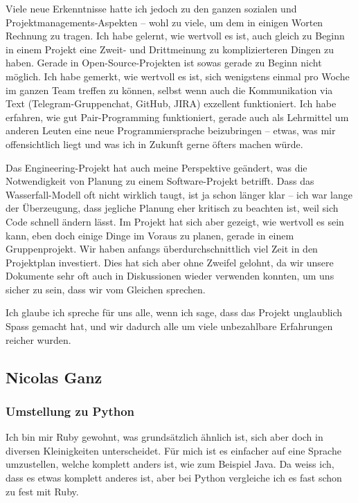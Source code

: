 \documentclass[a4paper]{article}
\begin{document}
Viele neue Erkenntnisse hatte ich jedoch zu den ganzen sozialen und
Projektmanagements-Aspekten -- wohl zu viele, um dem
in einigen Worten Rechnung zu tragen. Ich habe gelernt, wie wertvoll es ist,
auch gleich zu Beginn in einem Projekt eine Zweit- und Drittmeinung zu
komplizierteren Dingen zu haben. Gerade in Open-Source-Projekten ist sowas gerade zu
Beginn nicht möglich. Ich habe gemerkt, wie wertvoll es ist, sich
wenigstens einmal pro Woche im ganzen Team treffen zu können, selbst wenn auch
die Kommunikation via Text (Telegram-Gruppenchat, GitHub, JIRA) exzellent
funktioniert. Ich habe erfahren, wie gut Pair-Programming funktioniert,
gerade auch als Lehrmittel um anderen Leuten eine neue Programmiersprache
beizubringen -- etwas, was mir offensichtlich liegt und was ich in Zukunft gerne
öfters machen würde.

Das Engineering-Projekt hat auch meine Perspektive geändert, was die
Notwendigkeit von Planung zu einem Software-Projekt betrifft. Dass das
Wasserfall-Modell oft nicht wirklich taugt, ist ja schon länger klar -- ich war
lange der Überzeugung, dass jegliche Planung eher kritisch zu beachten ist, weil
sich Code schnell ändern lässt. Im Projekt hat sich aber gezeigt, wie wertvoll
es sein kann, eben doch einige Dinge im Voraus zu planen, gerade in einem
Gruppenprojekt. Wir haben anfangs überdurchschnittlich viel Zeit in den
Projektplan investiert. Dies hat sich aber ohne Zweifel gelohnt, da wir unsere
Dokumente sehr oft auch in Diskussionen wieder verwenden konnten, um uns sicher
zu sein, dass wir vom Gleichen sprechen.

Ich glaube ich spreche für uns alle, wenn ich sage, dass das Projekt
unglaublich Spass gemacht hat, und wir dadurch alle um viele unbezahlbare
Erfahrungen reicher wurden.

\pagebreak

\subsection{Nicolas Ganz}

\subsubsection{Umstellung zu Python}

Ich bin mir Ruby gewohnt, was grundsätzlich ähnlich ist, sich aber doch in diversen Kleinigkeiten unterscheidet.
Für mich ist es einfacher auf eine Sprache umzustellen, welche komplett anders ist, wie zum Beispiel Java.
Da weiss ich, dass es etwas komplett anderes ist, aber bei Python vergleiche ich es fast schon zu fest mit Ruby.
\end{document}
